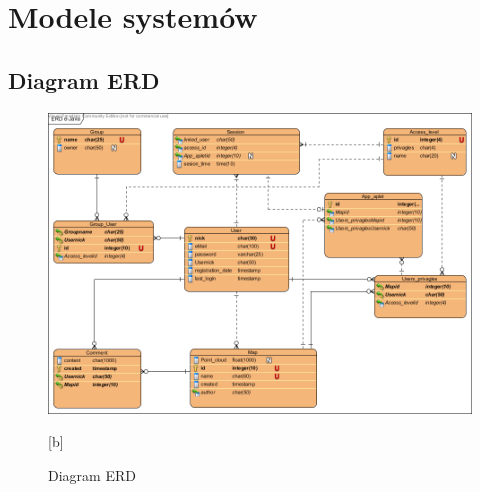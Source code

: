 \chapter{Modele systemów}
\section{Diagram ERD}

\begin{figure}[ht]

\includegraphics[scale=0.85,angle=270]{img/ERDJava.png}
\caption{Diagram ERD}[b]
\end{figure}
